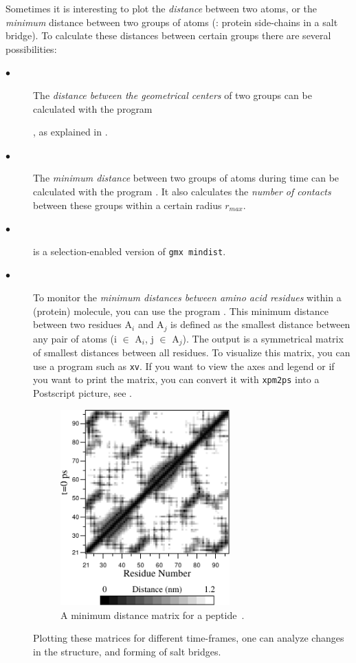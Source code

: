 Sometimes it is interesting to plot the {\em distance} between two atoms,
or the {\em minimum} distance between two groups of atoms
({\eg}: protein side-chains in a salt bridge). 
To calculate these distances between certain groups there are several 
possibilities:
\begin{description}
\item[$\bullet$] 
The {\em distance between the geometrical centers} of two groups can be 
calculated with the program

{{\tt {}}, as explained in .}
\item[$\bullet$]
The {\em minimum distance} between two groups of atoms during time 
can be calculated with the program {\tt {}}. It also calculates the 
{\em number of contacts} between these groups 
within a certain radius $r_{max}$.
\item[$\bullet$]
{\tt {}} is a selection-enabled version of
{\tt gmx mindist}.
\item[$\bullet$]
To monitor the {\em minimum distances between amino acid residues} 
within a (protein) molecule, you can use 
the program {\tt {}}. This minimum distance between two residues
A$_i$ and A$_j$ is defined as the smallest distance between any pair of 
atoms (i $\in$ A$_i$, j $\in$ A$_j$).
The output is a symmetrical matrix of smallest distances 
between all residues.
To visualize this matrix, you can use a program such as {\tt xv}.
If you want to view the axes and legend or if you want to print
the matrix, you can convert it with 
{\tt xpm2ps} into a Postscript picture, see .
\begin{figure}
\centerline{
\includegraphics[width=6.5cm]{plots/distm}}
\caption{A minimum distance matrix for a peptide~\protect\cite{Spoel96b}.}
\label{fig:mdmat}
\end{figure}

Plotting these matrices for different time-frames, one can analyze changes 
in the structure, and {\eg} forming of salt bridges.
\end{description}

